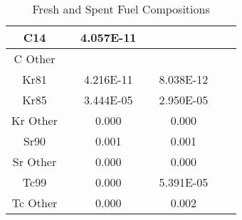 \begin{frame}
\begin{table}[h]
{\begin{tabular}{|c|c|c|c|c|c|c|}
         C14     &      &   4.057E-11 &          &       \\ \hline 
         C Other     &      &        &       &       \\ \hline 
         Kr81    &      &   4.216E-11 &          &  8.038E-12 \\ \hline 
         Kr85    &      &   3.444E-05 &          &  2.950E-05 \\ \hline 
         Kr Other    &      &   0.000 &          &  0.000 \\ \hline 
         Sr90    &      &   0.001 &          &  0.001 \\ \hline 
         Sr Other    &      &   0.000 &          &  0.000 \\ \hline 
         Tc99    &      &   0.000 &          &  5.391E-05 \\ \hline 
         Tc Other    &      &   0.000 &          &  0.002 \\ \hline 

        \end{tabular}}
        \caption{Fresh and Spent Fuel Compositions}
        \label{tab:comp}
\end {table}
\end{frame}